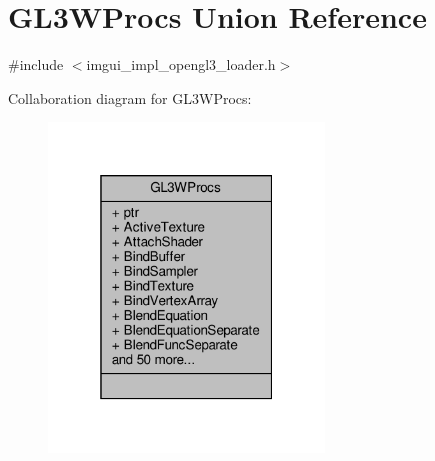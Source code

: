 \hypertarget{unionGL3WProcs}{}\section{G\+L3\+W\+Procs Union Reference}
\label{unionGL3WProcs}


{\ttfamily \#include $<$imgui\+\_\+impl\+\_\+opengl3\+\_\+loader.\+h$>$}



Collaboration diagram for G\+L3\+W\+Procs\+:
\nopagebreak
\begin{figure}[H]
\begin{center}
\leavevmode
\includegraphics[width=208pt]{unionGL3WProcs__coll__graph}
\end{center}
\end{figure}
